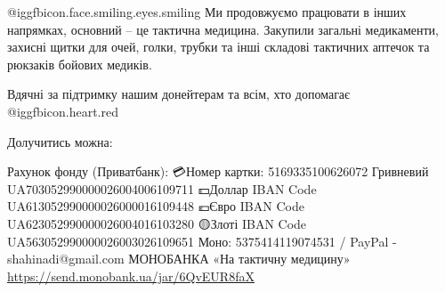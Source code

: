 @igg{fbicon.face.smiling.eyes.smiling} Ми продовжуємо працювати в інших
напрямках, основний – це тактична медицина.  Закупили загальні медикаменти,
захисні щитки для очей, голки, трубки та інші складові тактичних аптечок та
рюкзаків бойових медиків. 

Вдячні за підтримку нашим донейтерам та всім, хто допомагає @igg{fbicon.heart.red}

Долучитись можна:

Рахунок фонду (Приватбанк):
💳Номер картки: 5169335100626072
Гривневий
UA703052990000026004006109711
💵Доллар IBAN Code
UA613052990000026000016109448
💶Євро IBAN Code
UA623052990000026004016103280
🟡Злоті IBAN Code
UA563052990000026003026109651
Моно: 5375414119074531 /
PayPal - shahinadi@gmail.com
МОНОБАНКА 
«На тактичну медицину» 
🔗 \url{https://send.monobank.ua/jar/6QvEUR8faX }


